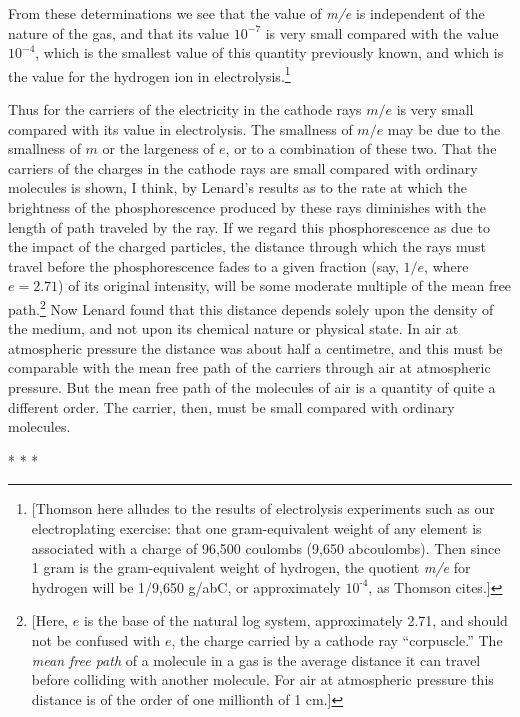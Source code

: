 From these determinations we see that the value of \emph{m/e} is
independent of the nature of the gas, and that its value $10^{-7}$ is very
small compared with the value $10^{-4}$, which is the smallest value of this
quantity previously known, and which is the value for the hydrogen ion
in electrolysis.\footnote{{[}Thomson here alludes to the results of
  electrolysis experiments such as our electroplating exercise: that one
  gram-equivalent weight of any element is associated with a charge of
  96,500 coulombs (9,650 abcoulombs). Then since 1 gram is the
  gram-equivalent weight of hydrogen, the quotient \emph{m/e} for
  hydrogen will be 1/9,650 g/abC, or approximately $10^{‑4}$, as Thomson
  cites.{]}}

Thus for the carriers of the electricity in the cathode rays $m/e$
is very small compared with its value in electrolysis. The smallness of
$m/e$ may be due to the smallness of $m$ or the largeness of
$e$, or to a combination of these two. That the carriers of the
charges in the cathode rays are small compared with ordinary molecules
is shown, I think, by Lenard's results as to the rate at which the
brightness of the phosphorescence produced by these rays diminishes with
the length of path traveled by the ray. If we regard this
phosphorescence as due to the impact of the charged particles, the
distance through which the rays must travel before the phosphorescence
fades to a given fraction (say, $1/e$, where $e = 2.71$)
of its original intensity, will be some moderate multiple of the mean
free path.\footnote{{[}Here, $e$ is the
  base of the natural log system, approximately 2.71, and should not be
  confused with $e$, the charge carried by a cathode ray
  ``corpuscle.'' The \emph{mean free path} of a molecule in a gas is the
  average distance it can travel before colliding with another molecule.
  For air at atmospheric pressure this distance is of the order of one
  millionth of 1 cm.{]}} Now Lenard found that this distance depends
solely upon the density of the medium, and not upon its chemical nature
or physical state. In air at atmospheric pressure the distance was about
half a centimetre, and this must be comparable with the mean free path
of the carriers through air at atmospheric pressure. But the mean free
path of the molecules of air is a quantity of quite a different order.
The carrier, then, must be small compared with ordinary molecules.\\
\centerline{* * *}

